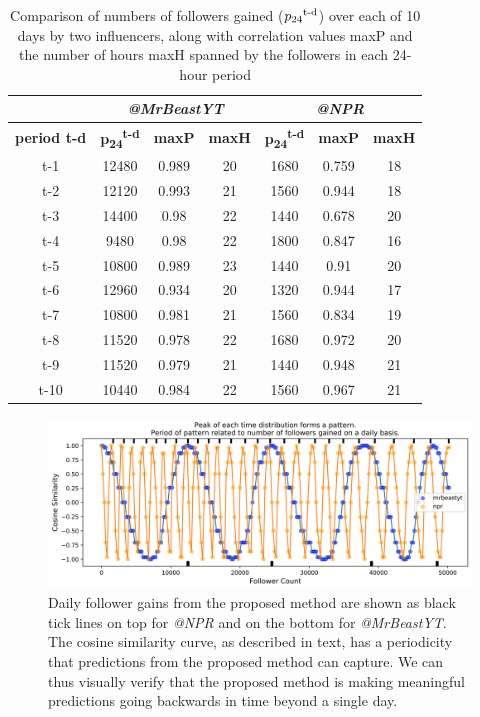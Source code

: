 \begin{table}[htbp]
\small
\caption[Inferring Daily Follower Gains over 10 days]{Comparison of numbers of followers gained 
($p\textsubscript{24}\textsuperscript{t-d}$)
over each of 10 days by two influencers, along with correlation values maxP and the number of hours maxH spanned by the followers in each 24-hour period}
\label{table_5N}
\centering
\begin{tabular}{|c|c|c|c|c|c|c|}
\multicolumn{1}{c}{}  & \multicolumn{3}{c}{\bfseries \emph{@MrBeastYT}} & \multicolumn{3}{c}{\bfseries \emph{@NPR}}\\
\hline
\bfseries period t-d & \bfseries p\textsubscript{24}\textsuperscript{t-d} & \bfseries maxP & \bfseries maxH & \bfseries \bfseries p\textsubscript{24}\textsuperscript{t-d} & \bfseries maxP & \bfseries maxH\\
\hline
t-1 & 12480 & 0.989 & 20 & 1680 & 0.759 & 18\\
\hline
t-2 & 12120 & 0.993 & 21 & 1560 & 0.944 & 18\\
\hline
t-3 & 14400 & 0.98 & 22 & 1440 & 0.678 & 20\\
\hline
t-4 & 9480 & 0.98 & 22 & 1800 & 0.847 & 16\\
\hline
t-5 & 10800 & 0.989 & 23 & 1440 & 0.91 & 20\\
\hline
t-6 & 12960 & 0.934 & 20 & 1320 & 0.944 & 17\\
\hline
t-7 & 10800 & 0.981 & 21 & 1560 & 0.834 & 19\\
\hline
t-8 & 11520 & 0.978 & 22 & 1680 & 0.972 & 20\\
\hline
t-9 & 11520 & 0.979 & 21 & 1440 & 0.948 & 21\\
\hline
t-10 & 10440 & 0.984 & 22 & 1560 & 0.967 & 21\\
\hline
\end{tabular}
\end{table}

\begin{figure}[!htb]
\centering
\includegraphics[width=5.9in]{Figures/BeastVsNPR.png}
 \caption[Visualizing Daily Follower Gains]{Daily follower gains from the proposed method are shown as black tick lines on top for \emph{@NPR} and on the bottom for \emph{@MrBeastYT}. The cosine similarity curve, as described in text, has a periodicity that predictions from the proposed method can capture. We can thus visually verify that the proposed method is making meaningful predictions going backwards in time beyond a single day.}
\label{fig_7N}
\end{figure}

